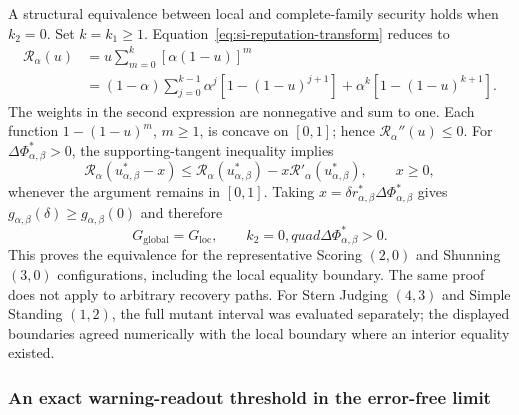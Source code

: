 \documentclass[fleqn,10pt]{wlscirep}
\begin{document}
A structural equivalence between local and complete-family security holds when $k_2=0$. Set $k=k_1\geq1$. Equation~\eqref{eq:si-reputation-transform} reduces to
\begin{equation}
\begin{aligned}
\mathcal R_\alpha(u)
&=u\sum_{m=0}^{k}[\alpha(1-u)]^m\\
&=(1-\alpha)\sum_{j=0}^{k-1}\alpha^j
\left[1-(1-u)^{j+1}\right]
+\alpha^k\left[1-(1-u)^{k+1}\right].
\end{aligned}
\label{eq:si-readout-concave-mixture}
\end{equation}
The weights in the second expression are nonnegative and sum to one. Each function $1-(1-u)^m$, $m\geq1$, is concave on $[0,1]$; hence $\mathcal R_\alpha''(u)\leq0$. For $\Delta\Phi^*_{\alpha,\beta}>0$, the supporting-tangent inequality implies
\begin{equation}
\mathcal R_\alpha(u^*_{\alpha,\beta}-x)
\leq\mathcal R_\alpha(u^*_{\alpha,\beta})
-x\mathcal R'_\alpha(u^*_{\alpha,\beta}),
\qquad x\geq0,
\label{eq:si-readout-tangent}
\end{equation}
whenever the argument remains in $[0,1]$. Taking $x=\delta r^*_{\alpha,\beta}\Delta\Phi^*_{\alpha,\beta}$ gives $g_{\alpha,\beta}(\delta)\geq g_{\alpha,\beta}(0)$ and therefore
\begin{equation}
G_{\mathrm{global}}=G_{\mathrm{loc}},\qquad k_2=0,quad \Delta\Phi^*_{\alpha,\beta}>0.
\label{eq:si-readout-local-global-equivalence}
\end{equation}
This proves the equivalence for the representative Scoring $(2,0)$ and Shunning $(3,0)$ configurations, including the local equality boundary. The same proof does not apply to arbitrary recovery paths. For Stern Judging $(4,3)$ and Simple Standing $(1,2)$, the full mutant interval was evaluated separately; the displayed boundaries agreed numerically with the local boundary where an interior equality existed.

\subsubsection{An exact warning-readout threshold in the error-free limit}
\label{sec:si-readout-errorfree}
\end{document}

